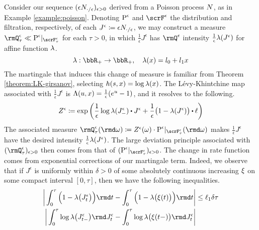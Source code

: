 \begin{example}
  \label{example:hawkes}
  Consider our sequence $(\epsilon N_{\cdot/\epsilon})_{\epsilon>0}$ derived from a Poisson process $N$, as in Example \ref{example:poisson}.
  Denoting ${\operatorname{P}}^\epsilon$ and $\scrF^\epsilon$ the distribution and filtration, respectively, of each $J^\epsilon \coloneqq \epsilon N_{\cdot/\epsilon}$, we may construct a measure $\mgPrb^\epsilon_\tau \ll \Prb^\epsilon|_{\scrF^\epsilon_\tau}$ for each $\tau > 0$, in which $\frac1\epsilon J^\epsilon$ has $\mgPrb^\epsilon$ intensity $\frac1\epsilon\lambda(J^\epsilon)$ for affine function $\lambda$.
  \begin{equation*}
    \affInt: \bbR_+ \rightarrow \bbR_+, \quad \affInt(\stateVar) = \affIntPart_0 + \affIntPart_1 \stateVar
  \end{equation*}
  The martingale that induces this change of measure is familiar from Theorem \ref{theorem:LK-girsanov}, selecting $h(s, x) = \log\lambda(x)$.
  The L\'evy-Khintchine map associated with $\frac1\epsilon J^\epsilon$ is $\Lambda(u, x) = \frac1\epsilon (e^u - 1)$, and it resolves to the following.
  \begin{equation*}
    \mgDensity^\epsilon \defeq \exp\bigg( \frac1\epsilon \log\affInt(J^\epsilon_-) \shortInt J^\epsilon + \frac1\epsilon\big( 1 - \affInt(J^\epsilon) \big) \shortInt \leb \bigg)
  \end{equation*}
  The associated measure $\mgPrb^\epsilon_\tau(\rmd\omega) \defeq \mgDensity^\epsilon(\omega) \cdot \Prb^\epsilon|_{\scrF^\epsilon_\tau}(\rmd\omega)$ makes $\frac1\epsilon J^\epsilon$ have the desired intensity $\frac1\epsilon\lambda(J^\epsilon)$.
  The large deviation principle associated with $(\mgPrb^\epsilon_\tau)_{\epsilon>0}$ then comes from that of $(\Prb^\epsilon|_{\scrF^\epsilon_\tau})_{\epsilon>0}$.
  The change in rate function comes from exponential corrections of our martingale term.
  Indeed, we observe that if $J^\epsilon$ is uniformly within $\delta > 0$ of some absolutely continuous increasing $\xi$ on some compact interval $[0,\tau]$, then we have the following inequalities.
  \begin{align*}
    \bigg| \int_0^\tau \Big( 1 - \affInt\big(J^\epsilon_t\big) \Big) \rmd t - \int_0^\tau \Big( 1 - \affInt\big( \pathVar(t) \big) \Big) \rmd t \bigg|
    &\leq \ell_1 \delta \tau \\
    \bigg| \int_0^\tau \log\affInt\big(J^\epsilon_{t-}\big) \rmd J^\epsilon_t - \int_0^\tau \log\affInt\big(\pathVar(t-)\big) \rmd J^\epsilon_t \bigg| 

\end{align*}
\end{example}
